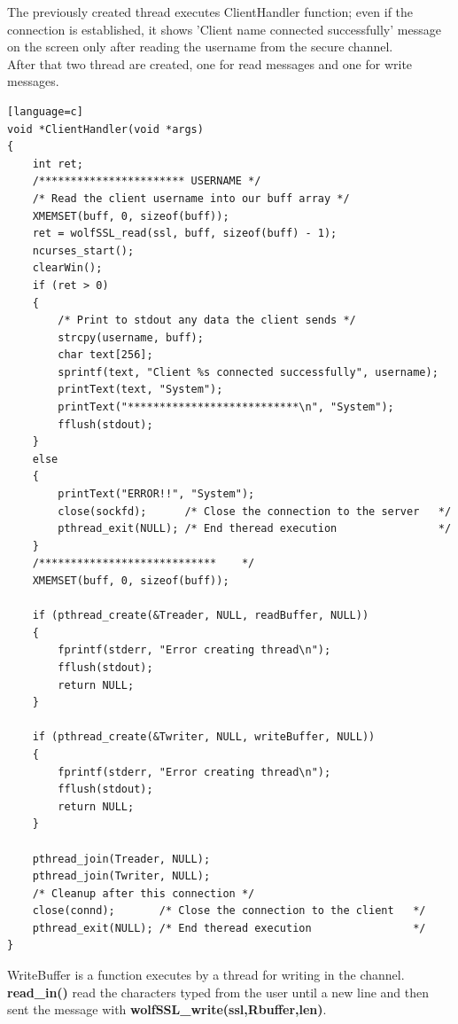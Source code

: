 \documentclass[a4paper,12pt]{report}
\begin{document}
The previously created thread executes ClientHandler function; even if the connection is established, it shows 'Client name connected successfully' message on the screen only after reading the username from the secure channel.
\\After that two thread are created, one for read messages and one for write messages.
\begin{lstlisting}[caption={ClientHandler() of SSL server},captionpos=b][language=c]
void *ClientHandler(void *args)
{
    int ret;
    /*********************** USERNAME */
    /* Read the client username into our buff array */
    XMEMSET(buff, 0, sizeof(buff));
    ret = wolfSSL_read(ssl, buff, sizeof(buff) - 1);
    ncurses_start();
    clearWin();
    if (ret > 0)
    {
        /* Print to stdout any data the client sends */
        strcpy(username, buff);
        char text[256];
        sprintf(text, "Client %s connected successfully", username);
        printText(text, "System");
        printText("***************************\n", "System");
        fflush(stdout);
    }
    else
    {
        printText("ERROR!!", "System");
        close(sockfd);      /* Close the connection to the server   */
        pthread_exit(NULL); /* End theread execution                */
    }
    /****************************    */
    XMEMSET(buff, 0, sizeof(buff));

    if (pthread_create(&Treader, NULL, readBuffer, NULL))
    {
        fprintf(stderr, "Error creating thread\n");
        fflush(stdout);
        return NULL;
    }

    if (pthread_create(&Twriter, NULL, writeBuffer, NULL))
    {
        fprintf(stderr, "Error creating thread\n");
        fflush(stdout);
        return NULL;
    }

    pthread_join(Treader, NULL);
    pthread_join(Twriter, NULL);
    /* Cleanup after this connection */
    close(connd);       /* Close the connection to the client   */
    pthread_exit(NULL); /* End theread execution                */
}

\end{lstlisting}
WriteBuffer is a function executes by a thread for writing in the channel. \textbf{read\_in()} read the characters typed from the user until a new line and then sent the message with \textbf{wolfSSL\_write(ssl,Rbuffer,len)}.
\end{document}
